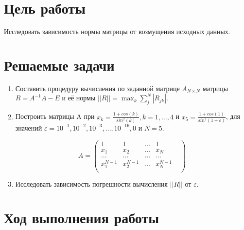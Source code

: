 




\section{Цель работы}
Исследовать зависимость нормы матрицы от возмущения исходных данных.

\section{Решаемые задачи}
\begin{enumerate}

\item Составить процедуру вычисления по заданной матрице $A_{N \times N}$ матрицы \\$R = A^{-1} A - E$ и её нормы $||R|| = \max_{k} \sum_j^N |R_{jk}|$.

\item Построить матрицы A при $x_k = \frac{1 + cos(k)}{sin^2(k)}, k = 1, \dots, 4$ и $x_5 = \frac{1+cos(1)}{sin^2(1 + \varepsilon)}$, для значений $\varepsilon = 10^{-1}, 10^{-2}, 10^{-3}, \dots, 10^{-16}, 0$ и $N = 5$.

\begin{displaymath}
A=
  \begin{pmatrix}
    1 & 1 & \dots & 1 \\
    x_1 & x_2 & \dots & x_N \\
    \dots & \dots & \dots & \dots & \\
    x_1^{N-1} & x_2^{N-1} & \dots & x_N^{N-1} \\
  \end{pmatrix}
\end{displaymath}


\item  Исследовать зависимость погрешности вычисления $||R||$ от $\varepsilon$.
\end{enumerate}


\section{Ход выполнения работы}

